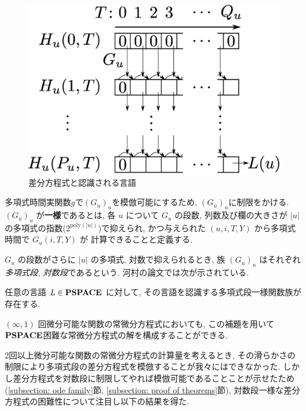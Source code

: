  \begin{figure}
  \label{fig:divp}
  \begin{center}
   \includegraphics[height=0.2\textheight]{image/divp.eps}
  \end{center}
  \caption{差分方程式と認識される言語}
 \end{figure}

多項式時間実関数$g$で$(G_u)_u$を模倣可能にするため, $(G_u)_u$に制限をかける.
$(G_u)_u$ が{\bf 一様}であるとは,
各 $u$ について $G _u$ の段数, 列数及び欄の大きさが $|u|$ の多項式の指数($2^{\mathrm{poly} (|u|)}$)で抑えられ, 
かつ与えられた $(u, i, T, Y)$ から多項式時間で $G_u(i, T, Y)$ が
計算できることと定義する.

$G_u$ の段数がさらに $|u|$ の多項式, 対数で抑えられるとき, 
族 $(G_u) _u$ はそれぞれ\emph{多項式段}, \emph{対数段}であるという. 
河村の論文では次が示されている.
\begin{lemma}
 \label{DIVPpolyIsPSPACEhard}
 任意の言語 $L \in \mathbf{PSPACE}$ に対して,
 その言語を認識する多項式段一様関数族が存在する.
\end{lemma}

$(\infty, 1)$ 回微分可能な関数の常微分方程式においても,
この補題を用いて$\mathbf{PSPACE}$困難な常微分方程式の解を構成することができる.

2回以上微分可能な関数の常微分方程式の計算量を考えるとき,
その滑らかさの制限により多項式段の差分方程式を模倣することが我々にはできなかった.
しかし差分方程式を対数段に制限してやれば模倣可能であることことが示せたため
(\ref{subsection: ode family}節, \ref{subsection: proof of theorems}節),
対数段一様な差分方程式の困難性について注目し以下の結果を得た.

